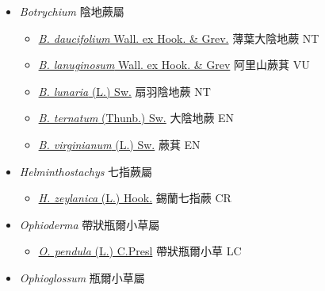 
  \begin{itemize}
 \item[] \textit{Botrychium} 陰地蕨屬
                    
  \begin{itemize}
        \item[] \href{http://www.theplantlist.org/tpl1.1/search?q=Botrychium+daucifolium}{\textit{B. daucifolium} Wall. ex Hook. \& Grev.}   薄葉大陰地蕨 NT
        \item[] \href{http://www.theplantlist.org/tpl1.1/search?q=Botrychium+lanuginosum}{\textit{B. lanuginosum} Wall. ex Hook. \& Grev}   阿里山蕨萁 VU
        \item[] \href{http://www.theplantlist.org/tpl1.1/search?q=Botrychium+lunaria}{\textit{B. lunaria} (L.) Sw.}   扇羽陰地蕨 NT
        \item[] \href{http://www.theplantlist.org/tpl1.1/search?q=Botrychium+ternatum}{\textit{B. ternatum} (Thunb.) Sw.}   大陰地蕨 EN
        \item[] \href{http://www.theplantlist.org/tpl1.1/search?q=Botrychium+virginianum}{\textit{B. virginianum} (L.) Sw.}   蕨萁 EN
  \end{itemize}
 \item[] \textit{Helminthostachys} 七指蕨屬
                    
  \begin{itemize}
        \item[] \href{http://www.theplantlist.org/tpl1.1/search?q=Helminthostachys+zeylanica}{\textit{H. zeylanica} (L.) Hook.}   錫蘭七指蕨 CR
  \end{itemize}
 \item[] \textit{Ophioderma} 帶狀瓶爾小草屬
                    
  \begin{itemize}
        \item[] \href{http://www.theplantlist.org/tpl1.1/search?q=Ophioderma+pendula}{\textit{O. pendula} (L.) C.Presl}   帶狀瓶爾小草 LC
  \end{itemize}
 \item[] \textit{Ophioglossum} 瓶爾小草屬
                    

\end{itemize}
